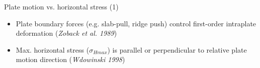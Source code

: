 \documentclass[10pt,xcolor=dvipsnames, aspectratio=169]{beamer}
\begin{document}

\begin{frame}{Plate motion vs. horizontal stress (1)}
    \begin{minipage}[c][0pt][c]{.4\linewidth}
    \begin{itemize}
      \item Plate boundary forces (e.g. slab-pull, ridge push) control first-order intraplate deformation (\textit{Zoback et al. 1989})
      \item Max. horizontal stress ($\sigma_{Hmax}$) is parallel or perpendicular to relative plate motion direction (\textit{Wdowinski 1998})
    \end{itemize}    
    \end{minipage}
	\hfill
    \begin{minipage}[c][200pt][c]{.58\linewidth}	
	\centering		
\end{minipage}
\end{frame}
\end{document}
